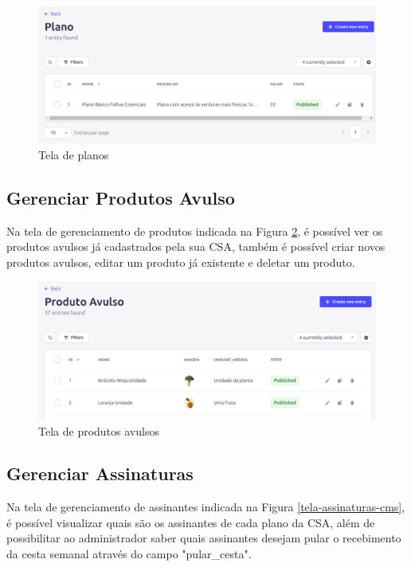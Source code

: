 \begin{figure}[h]
	\centering
	\includegraphics[keepaspectratio=true,scale=0.28]{figuras/painel_planos.png}
	\caption{Tela de planos}
        \label{tela-planos-cms}
\end{figure}

\subsection{Gerenciar Produtos Avulso}
Na tela de gerenciamento de produtos indicada na Figura \ref{tela-produtos-cms}, é possível ver os produtos avulsos já cadastrados pela sua CSA, também é possível criar novos produtos avulsos, editar um produto já existente e deletar um produto.

\begin{figure}[h]
	\centering
	\includegraphics[keepaspectratio=true,scale=0.28]{figuras/painel_produtos.png}
	\caption{Tela de produtos avulsos}
        \label{tela-produtos-cms}
\end{figure}

\subsection{Gerenciar Assinaturas}
Na tela de gerenciamento de assinantes indicada na Figura \ref{tela-assinaturas-cms}, é possível visualizar quais são os assinantes de cada plano da CSA, além de possibilitar ao administrador saber quais assinantes desejam pular o recebimento da cesta semanal através do campo "pular\_cesta".

